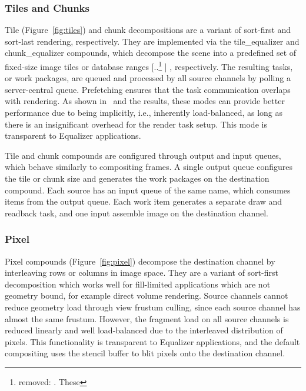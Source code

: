 \documentclass[10pt,journal,compsoc]{IEEEtran}
\newcommand{\fig}[1]{Figure~\ref{#1}}
\providecommand{\DIFaddtex}[1]{{\protect\color{blue} \sf #1}} %
\providecommand{\DIFdeltex}[1]{{\protect\color{red} [..\footnote{removed: #1} ]}} %
\providecommand{\DIFaddbegin}{} %
\providecommand{\DIFaddend}{} %
\providecommand{\DIFdelbegin}{} %
\providecommand{\DIFdelend}{} %
\providecommand{\DIFadd}[1]{\texorpdfstring{\DIFaddtex{#1}}{#1}} %
\providecommand{\DIFdel}[1]{\texorpdfstring{\DIFdeltex{#1}}{}} %
\newcommand{\DIFscaledelfig}{0.5}
\newlength{\DIFdelgraphicswidth} %
\newlength{\DIFdelgraphicsheight} %
\newcommand{\DIFaddincludegraphics}[2][]{{\color{blue}\fbox{\DIFOincludegraphics[#1]{#2}}}} %
\newcommand{\DIFdelincludegraphics}[2][]{%
\sbox{\DIFdelgraphicsbox}{\DIFOincludegraphics[#1]{#2}}%
\settoboxwidth{\DIFdelgraphicswidth}{\DIFdelgraphicsbox} %
\settoboxtotalheight{\DIFdelgraphicsheight}{\DIFdelgraphicsbox} %
\scalebox{\DIFscaledelfig}{%
\parbox[b]{\DIFdelgraphicswidth}{\usebox{\DIFdelgraphicsbox}\\[-\baselineskip] \rule{\DIFdelgraphicswidth}{0em}}\llap{\resizebox{\DIFdelgraphicswidth}{\DIFdelgraphicsheight}{%
\setlength{\unitlength}{\DIFdelgraphicswidth}%
\begin{picture}(1,1)%
\thicklines\linethickness{2pt} %
{\color[rgb]{1,0,0}\put(0,0){\framebox(1,1){}}}%
{\color[rgb]{1,0,0}\put(0,0){\line( 1,1){1}}}%
{\color[rgb]{1,0,0}\put(0,1){\line(1,-1){1}}}%
\end{picture}%
}\hspace*{3pt}}} %
} %
\DeclareRobustCommand{\DIFaddbegin}{\DIFOaddbegin \let\includegraphics\DIFaddincludegraphics} %
\DeclareRobustCommand{\DIFaddend}{\DIFOaddend \let\includegraphics\DIFOincludegraphics} %
\DeclareRobustCommand{\DIFdelbegin}{\DIFOdelbegin \let\includegraphics\DIFdelincludegraphics} %
\DeclareRobustCommand{\DIFdelend}{\DIFOaddend \let\includegraphics\DIFOincludegraphics} %
\begin{document}
\DIFaddend \subsubsection{Tiles and Chunks}\label{sec:tile}

Tile (\fig{fig:tiles}) and chunk decompositions are a variant of sort-first and
sort-last rendering, respectively. They \DIFaddbegin \DIFadd{are implemented via the
\textsf{tile\_equalizer} and \textsf{chunk\_equalizer} compounds, which
}\DIFaddend decompose the scene into a predefined set of fixed-size image tiles or database
ranges\DIFdelbegin \DIFdel{. These }\DIFdelend \DIFaddbegin \DIFadd{, respectively. The resulting }\DIFaddend tasks, or work packages, are queued and
processed by all source channels by polling a server-central queue. Prefetching
ensures that the task communication overlaps with rendering. As shown
in~\cite{SPEP:16} and the results, these modes can provide better performance
due to being implicitly, i.e., inherently load-balanced, as long as there is an
insignificant overhead for the render task setup. This mode is transparent to
\textsf{Equalizer} applications.

\DIFaddbegin \DIFadd{Tile and chunk compounds are configured through output and input queues, which
behave similarly to compositing frames. A single output queue configures the
tile or chunk size and generates the work packages on the destination compound.
Each source has an input queue of the same name, which consumes items from the
output queue. Each work item generates a separate draw and readback task, and
one input assemble image on the destination channel.
}


\DIFaddend \subsubsection{Pixel}

Pixel compounds (\fig{fig:pixel}) decompose the destination channel by
interleaving rows or columns in image space. They are a variant of sort-first
decomposition which works well for fill-limited applications which are not
geometry bound, for example direct volume rendering. Source channels cannot
reduce geometry load through view frustum culling, since each source channel has
almost the same frustum. However, the fragment load on all source channels is
reduced linearly and well load-balanced due to the interleaved distribution of
pixels. This functionality is transparent to \textsf{Equalizer} applications,
and the default compositing uses the stencil buffer to blit pixels onto the
destination channel.
\end{document}
